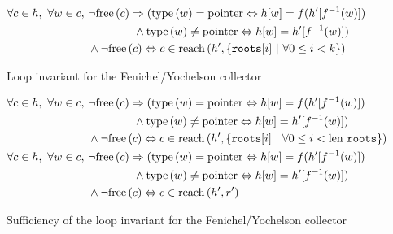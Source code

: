 \begin{figure}[t]
  \centering
  \begin{align*}
    \forall c \in h,\ \forall w \in c,\ &\lnot\mathrm{free}\left(c\right) \Rightarrow
    (\mathrm{type}\left(w\right) = \mathrm{pointer} \Leftrightarrow h[w] = f(h'[f^{-1}(w)])\\
    &\quad\quad\quad\quad \land \mathrm{type}\left(w\right) \neq \mathrm{pointer}
    \Leftrightarrow h[w] = h'[f^{-1}(w)])\\
    &\land \lnot\mathrm{free}\left(c\right) \Leftrightarrow c \in
    \mathrm{reach}\left(h', \{\mathtt{roots}[i]~|~\forall 0 \leq i < k\}\right)
  \end{align*}
  \captionsetup{format=default}
  \caption{Loop invariant for the Fenichel/Yochelson collector}
  \label{fig:copying-example-partial-invariant}
\end{figure}

\begin{figure}[t]
  \centering
  \begin{align*}
    \forall c \in h,\ \forall w \in c,\ &\lnot\free{c} \implies
    (\type{w} = \typointer \iff h[w] = f(h'[f^{-1}(w)])\\
    &\quad\quad\quad\quad \land \type{w} \neq \typointer
    \iff h[w] = h'[f^{-1}(w)])\\
    &\land \lnot\free{c} \iff c \in \reach{h'}{\{\mathtt{roots}[i]~|~\forall
      0 \leq i < \len\mathtt{roots}\}}\\
%
    \forall c \in h,\ \forall w \in c,\ &\lnot\free{c} \implies
    (\type{w} = \typointer \iff h[w] = f(h'[f^{-1}(w)])\\
    &\quad\quad\quad\quad \land \type{w} \neq \typointer
    \iff h[w] = h'[f^{-1}(w)])\\
    &\land \lnot\free{c} \iff c \in \reach{h'}{r'}
  \end{align*}
  \caption{Sufficiency of the loop invariant for the
    Fenichel/Yochelson collector}
  \label{fig:copying-example-partial-sufficient}
\end{figure}

